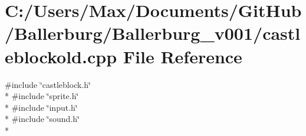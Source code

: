 \section{C\+:/\+Users/\+Max/\+Documents/\+Git\+Hub/\+Ballerburg/\+Ballerburg\+\_\+v001/castleblockold.cpp File Reference}
\label{castleblockold_8cpp}
{\ttfamily \#include \char`\"{}castleblock.\+h\char`\"{}}\\*
{\ttfamily \#include \char`\"{}sprite.\+h\char`\"{}}\\*
{\ttfamily \#include \char`\"{}input.\+h\char`\"{}}\\*
{\ttfamily \#include \char`\"{}sound.\+h\char`\"{}}\\*
